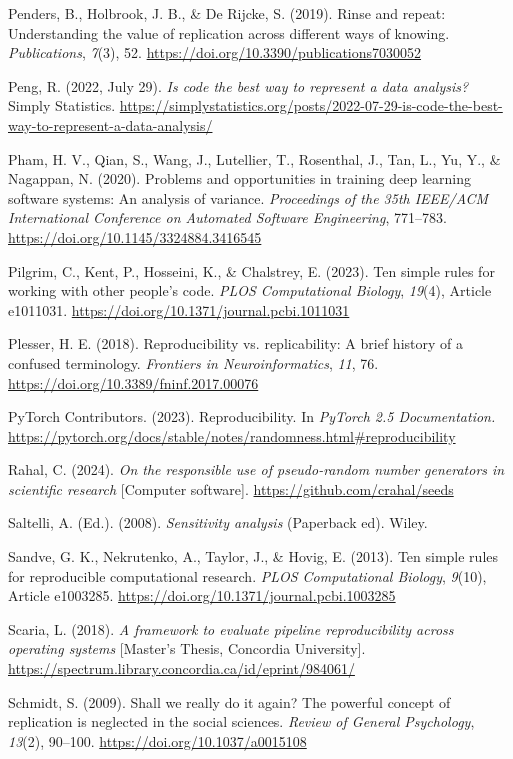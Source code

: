 \documentclass[authordate, meta]{jote-new-article}
\begin{document}
	Penders, B., Holbrook, J. B., \& De Rijcke, S. (2019). Rinse and repeat: Understanding the value of replication across different ways of knowing. \emph{Publications}, \emph{7}(3), 52. \url{https://doi.org/10.3390/publications7030052}


	Peng, R. (2022, July 29). \emph{Is code the best way to represent a data analysis?} Simply Statistics. \url{https://simplystatistics.org/posts/2022-07-29-is-code-the-best-way-to-represent-a-data-analysis/}


	Pham, H. V., Qian, S., Wang, J., Lutellier, T., Rosenthal, J., Tan, L., Yu, Y., \& Nagappan, N. (2020). Problems and opportunities in training deep learning software systems: An analysis of variance. \emph{Proceedings of the 35th IEEE/ACM International Conference on Automated Software Engineering}, 771--783. \url{https://doi.org/10.1145/3324884.3416545}


	Pilgrim, C., Kent, P., Hosseini, K., \& Chalstrey, E. (2023). Ten simple rules for working with other people's code. \emph{PLOS Computational Biology}, \emph{19}(4), Article e1011031. \url{https://doi.org/10.1371/journal.pcbi.1011031}


	Plesser, H. E. (2018). Reproducibility vs. replicability: A brief history of a confused terminology. \emph{Frontiers in Neuroinformatics}, \emph{11}, 76. \url{https://doi.org/10.3389/fninf.2017.00076}


	PyTorch Contributors. (2023). Reproducibility. In \emph{PyTorch 2.5 Documentation.} \url{https://pytorch.org/docs/stable/notes/randomness.html\#reproducibility}


	Rahal, C. (2024). \emph{On the responsible use of pseudo-random number generators in scientific research} [Computer software]. \url{https://github.com/crahal/seeds}


	Saltelli, A. (Ed.). (2008). \emph{Sensitivity analysis} (Paperback ed). Wiley.


	Sandve, G. K., Nekrutenko, A., Taylor, J., \& Hovig, E. (2013). Ten simple rules for reproducible computational research. \emph{PLOS Computational Biology}, \emph{9}(10), Article e1003285. \url{https://doi.org/10.1371/journal.pcbi.1003285}


	Scaria, L. (2018). \emph{A framework to evaluate pipeline reproducibility across operating systems} [Master's Thesis, Concordia University]. \url{https://spectrum.library.concordia.ca/id/eprint/984061/}


	Schmidt, S. (2009). Shall we really do it again? The powerful concept of replication is neglected in the social sciences. \emph{Review of General Psychology}, \emph{13}(2), 90--100. \url{https://doi.org/10.1037/a0015108}
\end{document}
